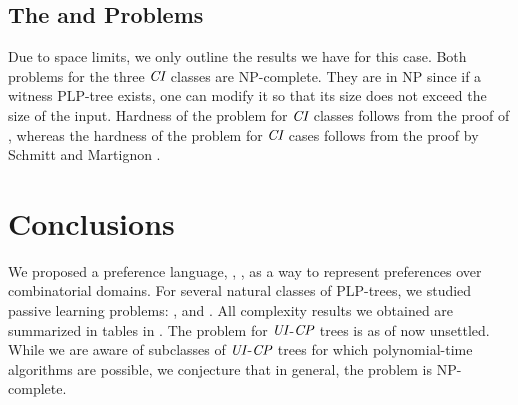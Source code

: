 \vspace{-0.1cm}
\subsection{The  and  Problems}

\vspace{-0.1cm}
Due to space limits, we only outline the results we have for this case. 
Both problems for the three $\textit{CI}$ classes are NP-complete. They are in 
NP since if a witness PLP-tree exists, one can modify it so that 
its size does not exceed the size of the input. Hardness of the 
 problem for $\textit{CI}$ classes follows from the proof of 
, whereas the hardness of the 
 problem for $\textit{CI}$ cases follows from the proof 
by Schmitt and Martignon .




\section{Conclusions}
We proposed a preference language, , , as a way to represent preferences over combinatorial 
domains. For several natural classes of PLP-trees, we studied passive learning 
problems: ,  and . All complexity
results we obtained are summarized in tables in . The
 problem for $\textit{UI}$-$\textit{CP}$ trees is as of now unsettled. While we are aware 
of subclasses of $\textit{UI}$-$\textit{CP}$ trees for which polynomial-time algorithms are 
possible, we conjecture that in general, the problem is NP-complete.

